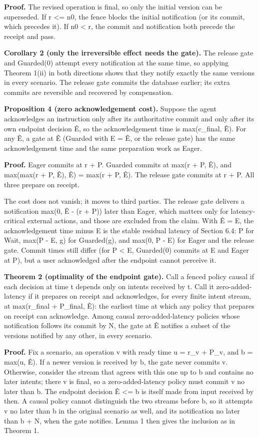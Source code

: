 \documentclass[review,12pt]{elsarticle}
\begin{document}
\textbf{Proof.} The revised operation is final, so only the initial version can be superseded. If r <= n0, the fence blocks the initial notification (or its commit, which precedes it). If n0 < r, the commit and notification both precede the receipt and pass.


\textbf{Corollary 2 (only the irreversible effect needs the gate).} The release gate and Guarded(0) attempt every notification at the same time, so applying Theorem 1(ii) in both directions shows that they notify exactly the same versions in every scenario. The release gate commits the database earlier; its extra commits are reversible and recovered by compensation.


\textbf{Proposition 4 (zero acknowledgement cost).} Suppose the agent acknowledges an instruction only after its authoritative commit and only after its own endpoint decision Ê, so the acknowledgement time is max(c\_\allowbreak{}final, Ê). For any Ê, a gate at Ê (Guarded with E = Ê, or the release gate) has the same acknowledgement time and the same preparation work as Eager.


\textbf{Proof.} Eager commits at r + P. Guarded commits at max(r + P, Ê), and max(max(r + P, Ê), Ê) = max(r + P, Ê). The release gate commits at r + P. All three prepare on receipt.


The cost does not vanish; it moves to third parties. The release gate delivers a notification max(0, Ê - (r + P)) later than Eager, which matters only for latency-critical external actions, and those are excluded from the claim. With Ê = E, the acknowledgement time minus E is the stable residual latency of Section 6.4: P for Wait, max(P - E, g) for Guarded(g), and max(0, P - E) for Eager and the release gate. Commit times still differ (for P < E, Guarded(0) commits at E and Eager at P), but a user acknowledged after the endpoint cannot perceive it.


\textbf{Theorem 2 (optimality of the endpoint gate).} Call a fenced policy causal if each decision at time t depends only on intents received by t. Call it zero-added-latency if it prepares on receipt and acknowledges, for every finite intent stream, at max(r\_\allowbreak{}final + P\_\allowbreak{}final, Ê): the earliest time at which any policy that prepares on receipt can acknowledge. Among causal zero-added-latency policies whose notification follows its commit by N, the gate at Ê notifies a subset of the versions notified by any other, in every scenario.


\textbf{Proof.} Fix a scenario, an operation v with ready time u = r\_\allowbreak{}v + P\_\allowbreak{}v, and b = max(u, Ê). If a newer version is received by b, the gate never commits v. Otherwise, consider the stream that agrees with this one up to b and contains no later intents; there v is final, so a zero-added-latency policy must commit v no later than b. The endpoint decision Ê <= b is itself made from input received by then. A causal policy cannot distinguish the two streams before b, so it attempts v no later than b in the original scenario as well, and its notification no later than b + N, when the gate notifies. Lemma 1 then gives the inclusion as in Theorem 1.
\end{document}
